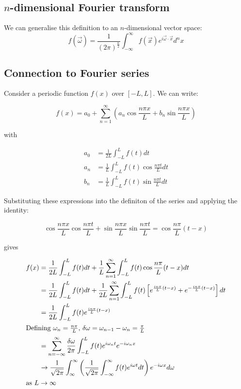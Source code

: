 \documentclass{physics_notes}
\begin{document}
\subsection{$n$-dimensional Fourier transform}

We can generalise this definition to an $n$-dimensional vector space:
\begin{equation}
\hat{f}(\vec{\omega}) = \frac{1}{(2\pi)^{\frac{n}{2}}} \int_{-\infty}^\infty f(\vec{x}) e^{i\vec{\omega}\cdot\vec{x}} d^n x
\end{equation}


\subsection{Connection to Fourier series}

Consider a periodic function $f(x)$ over $[-L,L]$. We can write:

\begin{equation}
f(x) = a_0 + \sum_{n=1}^\infty \left(a_n \cos{\frac{n\pi x}{L}} + b_n \sin{\frac{n\pi x}{L}}\right)
\end{equation}

with 

\begin{align*}
a_0 &= \frac{1}{2L}\int_{-L}^{L} f(t) dt \\
a_n &= \frac{1}{L}\int_{-L}^{L} f(t) \cos{\frac{n\pi t}{L}} dt \\
b_n &= \frac{1}{L}\int_{-L}^{L} f(t) \sin{\frac{n\pi t}{L}} dt
\end{align*}

Substituting these expressions into the definiton of the series and applying the identity:

\begin{equation*}
\cos{\frac{n\pi x}{L}}\cos{\frac{n\pi t}{L}} + \sin{\frac{n\pi x}{L}}\sin{\frac{n\pi t}{L}} = \cos{\frac{n\pi}{L}(t-x)}
\end{equation*}

gives

\begin{align*}
f(x) &= \frac{1}{2L}\int_{-L}^{L} f(t)dt + \frac{1}{L}\sum_{n=1}^\infty \int_{-L}^L f(t) \cos{\frac{n\pi}{L}(t-x)} dt \\
&= \frac{1}{2L}\int_{-L}^{L} f(t)dt + \frac{1}{2L}\sum_{n=1}^\infty \int_{-L}^L f(t) \left[ e^{\frac{in\pi}{L}(t-x)} + e^{-\frac{in\pi}{L}(t-x)} \right] dt \\
&= \frac{1}{2L}\int_{-L}^L f(t) e^{\frac{in\pi}{L}(t-x)} \\
\intertext{Defining $\omega_n = \frac{n\pi}{L}$, $\delta\omega = \omega_{n-1} - \omega_n = \frac{\pi}{L}$}
&=\sum_{n=-\infty}^{\infty} \frac{\delta\omega}{2\pi} \int_{-L}^L f(t) e^{i\omega_n t} e^{-i\omega_n x} \\
&\to \frac{1}{\sqrt{2\pi}}\int_{\infty}^\infty \left(\frac{1}{\sqrt{2\pi}} \int_{-\infty}^\infty f(t) e^{i\omega t}dt\right) e^{-i\omega x} d\omega \\
\intertext{as $L\to\infty$}
\end{align*}
\end{document}
